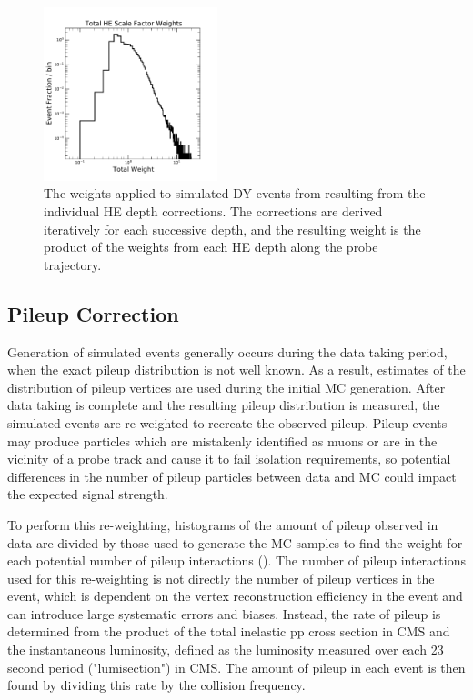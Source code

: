 \begin{figure}[htbp]
	\centering
	\includegraphics[width=0.45\textwidth]{figures/totalHEWeights.pdf}
	\caption[Applied HCAL Scale Factors]{The weights applied to simulated DY events from resulting from the individual HE depth corrections. The corrections are derived iteratively for each successive depth, and the resulting weight is the product of the weights from each HE depth along the probe trajectory.} 
        \label{fig:HESFs}
\end{figure}

\subsection{Pileup Correction}
Generation of simulated events generally occurs during the data taking period, when the exact pileup distribution is not well known.
As a result, estimates of the distribution of pileup vertices are used during the initial MC generation. 
After data taking is complete and the resulting pileup distribution is measured, the simulated events are re-weighted to recreate the observed pileup.
Pileup events may produce particles which are mistakenly identified as muons or are in the vicinity of a probe track and cause it to fail isolation requirements, so potential differences in the number of pileup particles between data and MC could impact the expected signal strength.

To perform this re-weighting, histograms of the amount of pileup observed in data are divided by those used to generate the MC samples to find the weight for each potential number of pileup interactions ().
The number of pileup interactions used for this re-weighting is not directly the number of pileup vertices in the event, which is dependent on the vertex reconstruction efficiency in the event and can introduce large systematic errors and biases.
Instead, the rate of pileup is determined from the product of the total inelastic pp cross section in CMS and the instantaneous luminosity, defined as the luminosity measured over each 23 second period ("lumisection") in CMS.
The amount of pileup in each event is then found by dividing this rate by the collision frequency.

